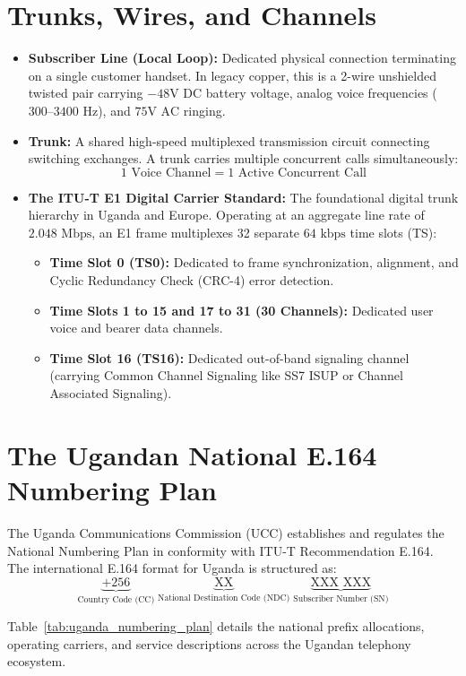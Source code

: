 \documentclass[12pt,a4paper]{report}
\begin{document}
\section{Trunks, Wires, and Channels}
\begin{itemize}
    \item \textbf{Subscriber Line (Local Loop):} Dedicated physical connection terminating on a single customer handset. In legacy copper, this is a 2-wire unshielded twisted pair carrying $-48\text{V DC}$ battery voltage, analog voice frequencies ($300\text{--}3400\text{ Hz}$), and $75\text{V AC}$ ringing.
    \item \textbf{Trunk:} A shared high-speed multiplexed transmission circuit connecting switching exchanges. A trunk carries multiple concurrent calls simultaneously:
    \[ 1\text{ Voice Channel} = 1\text{ Active Concurrent Call} \]
    \item \textbf{The ITU-T E1 Digital Carrier Standard:} The foundational digital trunk hierarchy in Uganda and Europe. Operating at an aggregate line rate of $2.048\text{ Mbps}$, an E1 frame multiplexes 32 separate $64\text{ kbps}$ time slots (TS):
    \begin{itemize}
        \item \textbf{Time Slot 0 (TS0):} Dedicated to frame synchronization, alignment, and Cyclic Redundancy Check (CRC-4) error detection.
        \item \textbf{Time Slots 1 to 15 and 17 to 31 (30 Channels):} Dedicated user voice and bearer data channels.
        \item \textbf{Time Slot 16 (TS16):} Dedicated out-of-band signaling channel (carrying Common Channel Signaling like SS7 ISUP or Channel Associated Signaling).
    \end{itemize}
\end{itemize}

\section{The Ugandan National E.164 Numbering Plan}
The Uganda Communications Commission (UCC) establishes and regulates the National Numbering Plan in conformity with ITU-T Recommendation E.164. The international E.164 format for Uganda is structured as:
\[ \underbrace{+256}_{\text{Country Code (CC)}} \; \underbrace{\text{XX}}_{\text{National Destination Code (NDC)}} \; \underbrace{\text{XXX XXX}}_{\text{Subscriber Number (SN)}} \]

Table~\ref{tab:uganda_numbering_plan} details the national prefix allocations, operating carriers, and service descriptions across the Ugandan telephony ecosystem.
\end{document}
